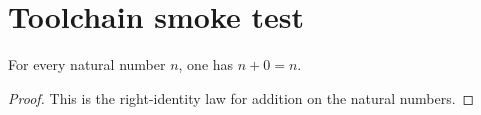 \chapter{Toolchain smoke test}

\begin{theorem}
  \label{thm:toolchain-demo}
  For every natural number $n$, one has $n+0=n$.
\end{theorem}
\begin{proof}

\leanok
  This is the right-identity law for addition on the natural numbers.
\end{proof}
